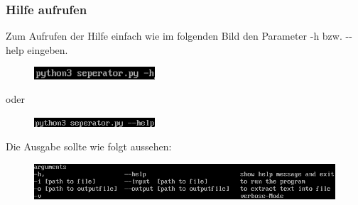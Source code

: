 \documentclass[12pt]{scrartcl}
\begin{document}
\subsubsection{Hilfe aufrufen}
\label{sec:first-steps-help}
Zum Aufrufen der Hilfe einfach wie im folgenden Bild den Parameter -h bzw. -{}-help eingeben.
\newline
\begin{figure}[htbp]
\centering
\includegraphics[width=0.4\textwidth]{ersteSchritteHilfeSeperator1}\par\vspace{0.25cm}
\label{fig:ersteSchritteHilfeSeperator1}
\end{figure}
\begin{center}
oder
\end{center}
\begin{figure}[htbp]
\centering
\includegraphics[width=0.4\textwidth]{ersteSchritteHilfeSeperator2}\par\vspace{0.25cm}
\label{fig:ersteSchritteHilfeSeperator2}
\end{figure}
Die Ausgabe sollte wie folgt aussehen:
\begin{figure}[htbp]
\centering
\includegraphics[width=1.1\textwidth]{ersteSchritteHilfeSeperator3}\par\vspace{0.5cm}
\label{fig:ersteSchritteHilfeSeperator3}
\end{figure}

\newpage


\end{document}

